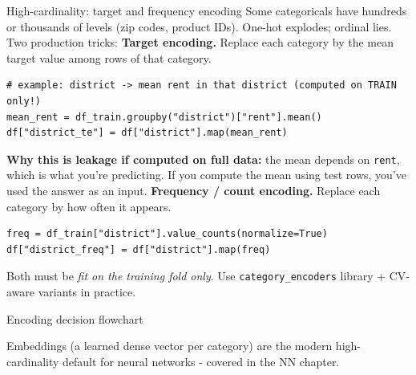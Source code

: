 \documentclass[aspectratio=169]{beamer}
\begin{document}
\begin{frame}[fragile]{High-cardinality: target and frequency encoding}
  Some categoricals have hundreds or thousands of levels (zip codes, product IDs). One-hot explodes; ordinal lies. Two production tricks:
  \vfill
  \textbf{Target encoding.} Replace each category by the mean target value among rows of that category.
\begin{lstlisting}
# example: district -> mean rent in that district (computed on TRAIN only!)
mean_rent = df_train.groupby("district")["rent"].mean()
df["district_te"] = df["district"].map(mean_rent)
\end{lstlisting}
  \footnotesize\textbf{Why this is leakage if computed on full data:} the mean depends on \texttt{rent}, which is what you're predicting. If you compute the mean using test rows, you've used the answer as an input.\normalsize
  \vfill
  \textbf{Frequency / count encoding.} Replace each category by how often it appears.
\begin{lstlisting}
freq = df_train["district"].value_counts(normalize=True)
df["district_freq"] = df["district"].map(freq)
\end{lstlisting}
  Both must be \emph{fit on the training fold only}. Use \texttt{category\_encoders} library + CV-aware variants in practice.
\end{frame}

\begin{frame}{Encoding decision flowchart}
  \begin{center}
  \end{center}
  \vfill
  Embeddings (a learned dense vector per category) are the modern high-cardinality default for neural networks - covered in the NN chapter.
\end{frame}
\end{document}
